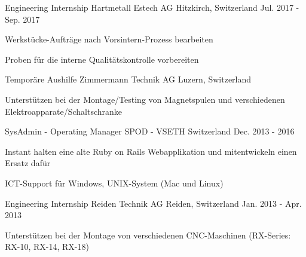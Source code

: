 \begin{cventries}
\cventry
	{Engineering Internship} %
	{Hartmetall Estech AG} %
	{Hitzkirch, Switzerland} %
	{Jul. 2017 - Sep. 2017} %
	{
		\begin{cvitems} %
			\item {Werkstücke-Aufträge nach Vorsintern-Prozess bearbeiten}
			\item {Proben für die interne Qualitätskontrolle vorbereiten}
		\end{cvitems}
}

\cventry
	{Temporäre Aushilfe} %
	{Zimmermann Technik AG} %
	{Luzern, Switzerland} %
	{} %
	{
		\begin{cvitems} %
			\item {Unterstützen bei der Montage/Testing von Magnetspulen und verschiedenen Elektroapparate/Schaltschranke}
		\end{cvitems}
	}	

  \cventry
    {SysAdmin - Operating Manager} %
    {SPOD - VSETH} %
    {Switzerland} %
    {Dec. 2013 - 2016} %
    {
      \begin{cvitems} %
        \item {Instant halten eine alte Ruby on Rails Webapplikation und mitentwickeln einen Ersatz dafür}
        \item {ICT-Support für Windows, UNIX-System (Mac und Linux)}
      \end{cvitems}
    }

  \cventry
    {Engineering Internship} %
    {Reiden Technik AG} %
    {Reiden, Switzerland} %
    {Jan. 2013 - Apr. 2013} %
    {
      \begin{cvitems} %
        \item {Unterstützen bei der Montage von verschiedenen CNC-Maschinen (RX-Series: RX-10, RX-14, RX-18)}
      \end{cvitems}
    }


\end{cventries}
